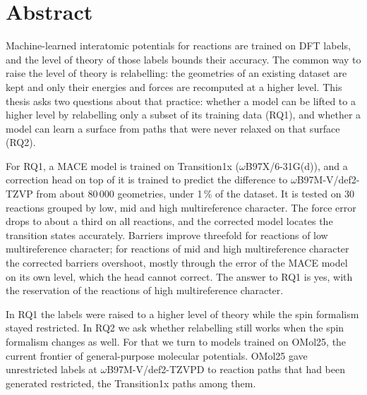 
\section*{Abstract}

Machine-learned interatomic potentials for reactions are trained on DFT
labels, and the level of theory of those labels bounds their accuracy.
The common way to raise the level of theory is relabelling: the geometries of an
existing dataset are kept and only their energies and forces are
recomputed at a higher level. This thesis asks two questions about
that practice: whether a model can be lifted to a higher level by
relabelling only a subset of its training data (RQ1), and whether a
model can learn a surface from paths that were never relaxed on that
surface (RQ2).

For RQ1, a MACE model is trained on Transition1x
(\mbox{$\omega$B97X/6-31G(d)}), and a correction head on top of it
is trained to predict the difference to \mbox{$\omega$B97M-V/def2-TZVP}
from about 80\,000 geometries, under 1\,\% of the dataset. It is tested on 30 reactions grouped by low, mid and high
multireference character. The force error drops to about a third on all reactions, and the
corrected model locates the transition states accurately. Barriers improve
threefold for reactions of low multireference character; for reactions
of mid and high multireference character the corrected barriers
overshoot, mostly through the error of the MACE model on its own
level, which the head cannot correct. The answer to RQ1 is yes, with the reservation of
the reactions of high multireference character.

In RQ1 the labels were raised to a higher level of theory while the
spin formalism stayed restricted. In RQ2 we ask whether relabelling still
works when the spin formalism changes as well. For that we turn to
models trained on OMol25, the current frontier of general-purpose
molecular potentials. OMol25 gave unrestricted labels at
\mbox{$\omega$B97M-V/def2-TZVPD} to reaction paths that had been
generated restricted, the Transition1x paths among them.

